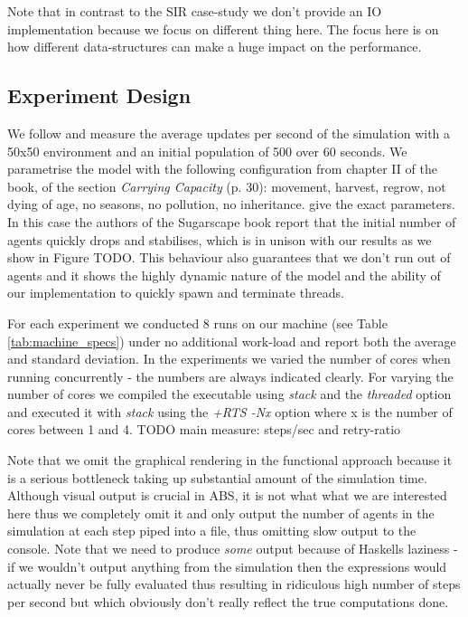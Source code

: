 Note that in contrast to the SIR case-study we don't provide an IO implementation because we focus on different thing here. The focus here is on how different data-structures can make a huge impact on the performance.

\subsection{Experiment Design}
We follow \cite{lysenko_framework_2008} and measure the average updates per second of the simulation with a 50x50 environment and an initial population of 500 over 60 seconds. We parametrise the model with the following configuration from chapter II of the book, of the section \textit{Carrying Capacity} (p. 30): movement, harvest, regrow, not dying of age, no seasons, no pollution, no inheritance. give the exact parameters. In this case the authors of the Sugarscape book report that the initial number of agents quickly drops and stabilises, which is in unison with our results as we show in Figure TODO. This behaviour also guarantees that we don't run out of agents and it shows the highly dynamic nature of the model and the ability of our implementation to quickly spawn and terminate threads.

For each experiment we conducted 8 runs on our machine (see Table \ref{tab:machine_specs}) under no additional work-load and report both the average and standard deviation. In the experiments we varied the number of cores when running concurrently - the numbers are always indicated clearly. For varying the number of cores we compiled the executable using \textit{stack} and the \textit{threaded} option and executed it with \textit{stack} using the \textit{+RTS -Nx} option where x is the number of cores between 1 and 4. TODO main measure: steps/sec and retry-ratio

Note that we omit the graphical rendering in the functional approach because it is a serious bottleneck taking up substantial amount of the simulation time. Although visual output is crucial in ABS, it is not what what we are interested here thus we completely omit it and only output the number of agents in the simulation at each step piped into a file, thus omitting slow output to the console. Note that we need to produce \textit{some} output because of Haskells laziness - if we wouldn't output anything from the simulation then the expressions would actually never be fully evaluated thus resulting in ridiculous high number of steps per second but which obviously don't really reflect the true computations done.

